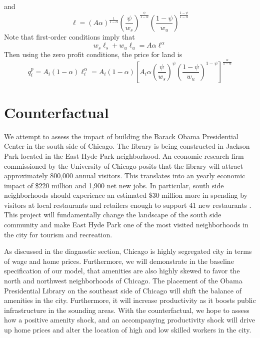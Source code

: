 \documentclass[12pt]{article}
\begin{document}
and 
\begin{equation*}
    \ell = (A\alpha)^{\frac{1}{1-\alpha}}\left(\frac{\psi}{w_s}\right)^{\frac{\psi}{1-\alpha}}\left(\frac{1-\psi}{w_u}\right)^{\frac{1-\psi}{1-\alpha}}
\end{equation*}
Note that first-order conditions imply that 
\begin{equation*}
    w_s\ell_s +  w_u\ell_u = A\alpha\ell^\alpha
\end{equation*}
Then using the zero profit conditions, the price for land is 
\begin{equation*}
    q_i^p = A_i(1-\alpha)\ell_i^\alpha = A_i(1-\alpha)\left[A_i\alpha\left(\frac{\psi}{w_s}\right)^{\psi}\left(\frac{1-\psi}{w_u}\right)^{1-\psi}\right]^{\frac{\alpha}{1-\alpha}}
\end{equation*}


\section{Counterfactual}

We attempt to assess the impact of building the Barack Obama Presidential Center in the south side of Chicago. The library is being constructed in Jackson Park located in the East Hyde Park neighborhood. An economic research firm commissioned by the University of Chicago posits that the library will attract approximately 800,000 annual visitors. This translates into an yearly economic impact of \$220 million and 1,900 net new jobs. In particular, south side neighborhoods should experience an estimated \$30 million more in spending by visitors at local restaurants and retailers enough to support 41 new restaurants \citep{aeg2014}. This project will fundamentally change the landscape of the south side community and make East Hyde Park one of the most visited neighborhoods in the city for tourism and recreation. 

As discussed in the diagnostic section, Chicago is highly segregated city in terms of wage and home prices. Furthermore, we will demonstrate in the baseline specification of our model, that amenities are also highly skewed to favor the north and northwest neighborhoods of Chicago. The placement of the Obama Presidential Library on the southeast side of Chicago will shift the balance of amenities in the city. Furthermore, it will increase productivity as it boosts public infrastructure in the sounding areas. With the counterfactual, we hope to assess how a positive amenity shock, and an accompanying productivity shock will drive up home prices and alter the location of high and low skilled workers in the city.
\end{document}
